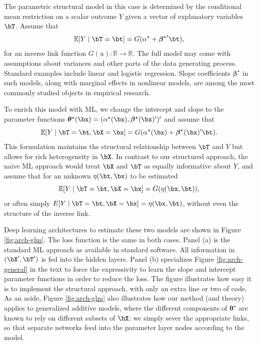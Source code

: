 \documentclass[12pt]{article}
\numberwithin{equation}{section}
\theoremstyle{definition}
\newcommand{\E}{\mathbb{E}}
\newcommand{\R}{\mathbb{R}}
\newcommand{\btheta}{\boldsymbol{\theta}}
\newcommand{\bbeta}{\boldsymbol{\beta}}
\newcommand{\bttrue}{\btheta^\star}
\newcommand{\atrue}{\alpha^\star}
\newcommand{\bbtrue}{\bbeta^\star}
\begin{document}
\begin{appendices}
The parametric structural model in this case is determined by the conditional mean restriction on a scalar outcome $Y$ given a vector of explanatory variables $\bT$. Assume that
\begin{equation}
    \label{eqn:glm parametric}
    \E[Y \mid \bT = \bt] = G(\atrue + {\bbtrue}'\bt ),
\end{equation}
for an inverse link function $G(u): \R \to \R$. The full model may come with assumptions about variances and other parts of the data generating process. Standard examples include linear and logistic regression. Slope coefficients $\bbtrue$ in such models, along with marginal effects in nonlinear models, are among the most commonly studied objects in empirical research. 

To enrich this model with ML, we change the intercept and slope to the parameter functions $\bttrue(\bx) = (\atrue(\bx), \bbtrue(\bx)')'$ and assume that
\begin{equation}
    \label{eqn:glm flm2}
    \E[Y \mid \bT = \bt, \bX=\bx] = G(\atrue(\bx) + \bbtrue(\bx)'\bt ).
\end{equation}
This formulation maintains the structural relationship between $\bT$ and $Y$ but allows for rich heterogeneity in $\bX$. In contrast to our structured approach, the naive ML approach would treat $\bX$ and $\bT$ as equally informative about $Y$, and assume that for an unknown $\eta(\bt,\bx)$ to be estimated
\begin{equation}
    \label{eqn:glm naive}
    \E[Y \mid \bT = \bt, \bX=\bx] = G(\eta(\bx,\bt)),
\end{equation}
or often simply $E[Y \mid \bT = \bt, \bX=\bx] = \eta(\bx,\bt)$, without even the structure of the inverse link.


Deep learning architectures to estimate these two models are shown in Figure \ref{fig:arch-glm}. The loss function is the same in both cases. Panel (a) is the standard ML approach as available in standard software. All information in $(\bX', \bT')$ is fed into the hidden layers. Panel (b) specializes Figure \ref{fig:arch-general} in the text to force the expressivity to learn the slope and intercept parameter functions in order to reduce the loss. The figure illustrates how easy it is to implement the structural approach, with only an extra line or two of code. As an aside, Figure \ref{fig:arch-glm} also illustrates how our method (and theory) applies to generalized additive models, where the different components of $\bttrue$ are known to rely on different subsets of $\bX$: we simply sever the appropriate links, so that separate networks feed into the parameter layer nodes according to the model. 


\end{appendices}
\end{document}
